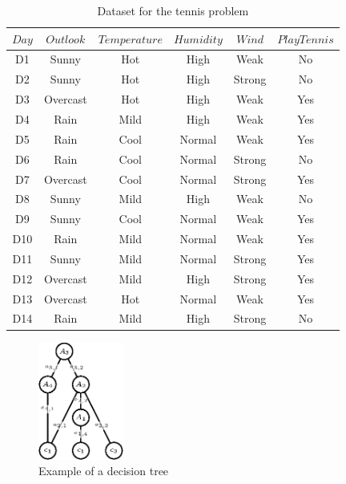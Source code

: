 \documentclass[10pt, letterpaper]{report}
\begin{document}
\begin{table}[h]
    \centering
    \caption{Dataset for the tennis problem}
    \label{tab:tennis_data_big}
\begin{tabular}{cccccc}
\toprule
$Day$ & $Outlook$ & $Temperature$ & $Humidity$ & $Wind$ & $PlayTennis$ \\
\midrule
D1 & Sunny & Hot & High & Weak & No \\
D2 & Sunny & Hot & High & Strong & No \\
D3 & Overcast & Hot & High & Weak & Yes \\
D4 & Rain & Mild & High & Weak & Yes \\
D5 & Rain & Cool & Normal & Weak & Yes \\
D6 & Rain & Cool & Normal & Strong & No \\
D7 & Overcast & Cool & Normal & Strong & Yes \\
D8 & Sunny & Mild & High & Weak & No \\
D9 & Sunny & Cool & Normal & Weak & Yes \\
D10 & Rain & Mild & Normal & Weak & Yes \\
D11 & Sunny & Mild & Normal & Strong & Yes \\
D12 & Overcast & Mild & High & Strong & Yes \\
D13 & Overcast & Hot & Normal & Weak & Yes \\
D14 & Rain & Mild & High & Strong & No \\
\bottomrule
\end{tabular}
\end{table}

\begin{figure}[h!]
    \centering
    \includegraphics[width=0.25\textwidth]{images/decision_tree.eps}
    \caption{Example of a decision tree}
    \label{img:dec_tree}
\end{figure}
\end{document}
